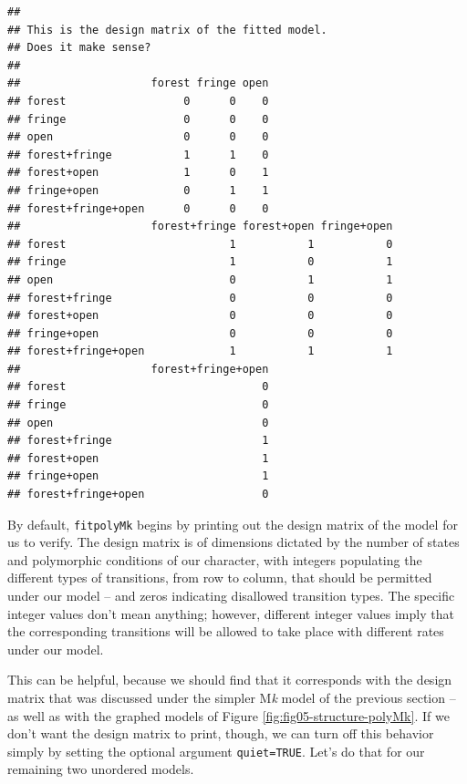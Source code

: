\documentclass[fleqn,10pt,lineno]{wlpeerj} %
\begin{document}
\begin{verbatim}
## 
## This is the design matrix of the fitted model.
## Does it make sense?
## 
##                    forest fringe open
## forest                  0      0    0
## fringe                  0      0    0
## open                    0      0    0 
## forest+fringe           1      1    0
## forest+open             1      0    1
## fringe+open             0      1    1
## forest+fringe+open      0      0    0
##                    forest+fringe forest+open fringe+open
## forest                         1           1           0
## fringe                         1           0           1
## open                           0           1           1
## forest+fringe                  0           0           0
## forest+open                    0           0           0
## fringe+open                    0           0           0
## forest+fringe+open             1           1           1
##                    forest+fringe+open
## forest                              0
## fringe                              0
## open                                0
## forest+fringe                       1
## forest+open                         1
## fringe+open                         1
## forest+fringe+open                  0
\end{verbatim}

By default, \texttt{fitpolyMk} begins by printing out the design matrix of the model for us to verify. The design matrix is of dimensions dictated by the number of states and polymorphic conditions of our character, with integers populating the different types of transitions, from row to column, that should be permitted under our model -- and zeros indicating disallowed transition types. The specific integer values don't mean anything; however, different integer values imply that the corresponding transitions will be allowed to take place with different rates under our model.

This can be helpful, because we should find that it corresponds with the design matrix that was discussed under the simpler M\emph{k} model of the previous section -- as well as with the graphed models of Figure \ref{fig:fig05-structure-polyMk}. If we don't want the design matrix to print, though, we can turn off this behavior simply by setting the optional argument \texttt{quiet=TRUE}. Let's do that for our remaining two unordered models.
\end{document}
